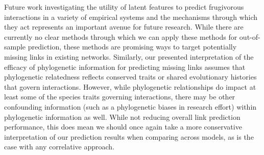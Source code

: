 \documentclass[num-refs]{article}%
\begin{document}
Future work investigating the utility of latent features to predict frugivorous interactions in a variety of empirical systems and the mechanisms through which they act represents an important avenue for future research. While there are currently no clear methods through which we can apply these methods for out-of-sample prediction, these methods are promising ways to target potentially missing links in existing networks. Similarly, our presented interpretation of the efficacy of phylogenetic information for predicting missing links assumes that phylogenetic relatedness reflects conserved traits or shared evolutionary histories that govern interactions. However, while phylogenetic relationships do impact at least some of the species traits governing interactions, there may be other confounding information (such as a phylogenetic biases in research effort) within phylogenetic information as well. While not reducing overall link prediction performance, this does mean we should once again take a more conservative interpretation of our prediction results when comparing across models, as is the case with any correlative approach. 
\end{document}
